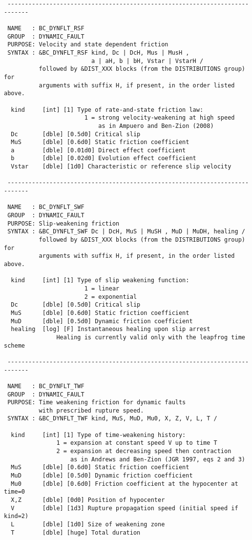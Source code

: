 \begin{verbatim}
 ----------------------------------------------------------------------------

 NAME   : BC_DYNFLT_RSF
 GROUP  : DYNAMIC_FAULT
 PURPOSE: Velocity and state dependent friction
 SYNTAX : &BC_DYNFLT_RSF kind, Dc | DcH, Mus | MusH , 
                         a | aH, b | bH, Vstar | VstarH /
          followed by &DIST_XXX blocks (from the DISTRIBUTIONS group) for
          arguments with suffix H, if present, in the order listed above.

  kind     [int] [1] Type of rate-and-state friction law:
                       1 = strong velocity-weakening at high speed
                           as in Ampuero and Ben-Zion (2008)
  Dc       [dble] [0.5d0] Critical slip 
  MuS      [dble] [0.6d0] Static friction coefficient
  a        [dble] [0.01d0] Direct effect coefficient
  b        [dble] [0.02d0] Evolution effect coefficient
  Vstar    [dble] [1d0] Characteristic or reference slip velocity

 ----------------------------------------------------------------------------

 NAME   : BC_DYNFLT_SWF
 GROUP  : DYNAMIC_FAULT
 PURPOSE: Slip-weakening friction
 SYNTAX : &BC_DYNFLT_SWF Dc | DcH, MuS | MuSH , MuD | MuDH, healing /
          followed by &DIST_XXX blocks (from the DISTRIBUTIONS group) for
          arguments with suffix H, if present, in the order listed above.

  kind     [int] [1] Type of slip weakening function:
                       1 = linear
                       2 = exponential
  Dc       [dble] [0.5d0] Critical slip 
  MuS      [dble] [0.6d0] Static friction coefficient
  MuD      [dble] [0.5d0] Dynamic friction coefficient
  healing  [log] [F] Instantaneous healing upon slip arrest
               Healing is currently valid only with the leapfrog time scheme

 ----------------------------------------------------------------------------

 NAME   : BC_DYNFLT_TWF
 GROUP  : DYNAMIC_FAULT
 PURPOSE: Time weakening friction for dynamic faults 
          with prescribed rupture speed.
 SYNTAX : &BC_DYNFLT_TWF kind, MuS, MuD, Mu0, X, Z, V, L, T /

  kind     [int] [1] Type of time-weakening history:
               1 = expansion at constant speed V up to time T
               2 = expansion at decreasing speed then contraction
                   as in Andrews and Ben-Zion (JGR 1997, eqs 2 and 3)
  MuS      [dble] [0.6d0] Static friction coefficient
  MuD      [dble] [0.5d0] Dynamic friction coefficient
  Mu0      [dble] [0.6d0] Friction coefficient at the hypocenter at time=0
  X,Z      [dble] [0d0] Position of hypocenter
  V        [dble] [1d3] Rupture propagation speed (initial speed if kind=2)
  L        [dble] [1d0] Size of weakening zone
  T        [dble] [huge] Total duration


\end{verbatim}
